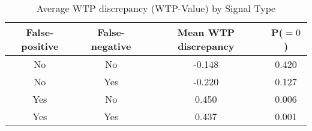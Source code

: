 \begin{table}[H]\centering \caption{Average WTP discrepancy (WTP-Value) by Signal Type} \begin{tabular}{cccc} \hline \hline
\textbf{False-positive}&\textbf{False-negative}&\textbf{Mean WTP discrepancy}& \textbf{P($=0$)}\\ \hline
No&No&-0.148&0.420\\
No&Yes&-0.220&0.127\\
Yes&No&0.450&0.006\\
Yes&Yes&0.437&0.001\\
\hline \end{tabular} \end{table}
